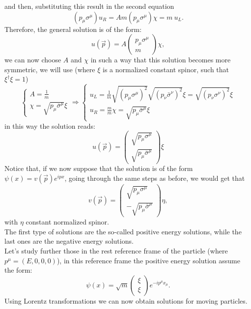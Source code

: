 and then, substituting this result in the second equation
\begin{equation*}
    (p_\mu\sigma^\mu)u_R=Am(p_\mu\sigma^\mu)\chi=m\ u_L.
\end{equation*}
Therefore, the general solution is of the form:
\begin{equation*}
    u(\vec p)=A\begin{pmatrix}
        p_\mu\sigma^\mu\\m
    \end{pmatrix}\chi,
\end{equation*}
we can now choose $A$ and $\chi$ in such a way that this solution becomes more symmetric, we will use (where $\xi$ is a normalized constant spinor, such that $\xi^{\dagger}\xi=1$)\begin{equation*}
    \begin{cases}
        A=\frac{1}{m}\\\chi=\sqrt{p_\mu\bar\sigma^\mu}\xi
    \end{cases}\Rightarrow
    \begin{cases}
        u_L=\frac{1}{m}\sqrt{(p_\mu\sigma^\mu)^2}\sqrt{(p_\nu\bar\sigma^\nu)^2}\xi=\sqrt{(p_\nu\sigma^\nu)^2}\xi\\u_R=\frac{m}{m}\chi=\sqrt{p_\mu\bar\sigma^\mu}\xi
    \end{cases}
\end{equation*}
in this way the solution reads:
\begin{equation*}
    u(\vec p)=\begin{pmatrix}
        \sqrt{p_\mu\sigma^\mu}\\\sqrt{p_\mu\bar\sigma^\mu}
    \end{pmatrix}\xi
\end{equation*}
Notice that, if we now suppose that the solution is of the form $\psi(x)=v(\vec p)e^{ipx}$, going through the same steps as before, we would get that 
\begin{equation*}
    v(\vec p)=\begin{pmatrix}
        \sqrt{p_\mu\sigma^\mu}\\-\sqrt{p_\mu\bar\sigma^\mu}
    \end{pmatrix}\eta,
\end{equation*}
with $\eta$ constant normalized spinor.\\The first type of solutions are the so-called positive energy solutions, while the last ones are the negative energy solutions.\\

Let's study further those in the rest reference frame of the particle (where $p^\mu=(E,0,0,0)$), in this reference frame the positive energy solution assume the form:
\begin{equation*}
    \psi(x)=\sqrt{m}\begin{pmatrix}
        \xi\\\xi
    \end{pmatrix}e^{-ip^\mu  x_\mu}.
\end{equation*}
Using Lorentz transformations we can now obtain solutions for moving particles.\\

